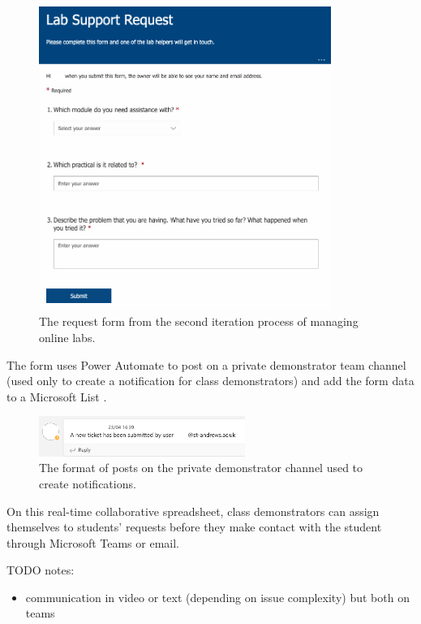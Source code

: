 \FloatBarrier
\begin{figure}[H]
  \centering
  \includegraphics[width=0.85\textwidth]{2context/images/teams2a.png}
  \caption{The request form from the second iteration process of managing online labs.}
\end{figure}

The form uses Power Automate \cite{pauto} to post on a private demonstrator team channel (used only to create a notification for class demonstrators) and add the form data to a Microsoft List \cite{lists}.

\FloatBarrier
\begin{figure}[H]
  \centering
  \includegraphics[width=0.6\textwidth]{2context/images/teams2b.png}
  \caption{The format of posts on the private demonstrator channel used to create notifications.}
\end{figure}

On this real-time collaborative spreadsheet, class demonstrators can assign themselves to students' requests before they make contact with the student through Microsoft Teams \cite{teams} or email. 

TODO notes:
\begin{itemize}
  \item communication in video or text (depending on issue complexity) but both on teams
\end{itemize}

